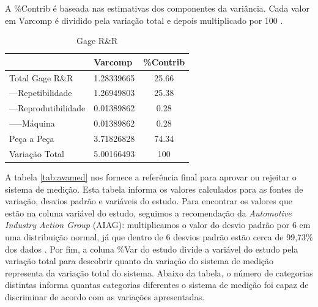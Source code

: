 \documentclass[
12pt,					%
openright,				%
oneside,				%
a4paper,				%
english,
brazil
]{ABNT/abntex2_report}
\begin{document}
A \%Contrib  é baseada nas estimativas dos componentes da variância. Cada valor em Varcomp é dividido pela variação total e depois multiplicado por 100 \cite{estudos_rr}.  

\begin{table}[H]
	\caption{Gage R\&R}
	\centering
	\begin{tabular}{lcc}
										   & \multicolumn{1}{l}{Varcomp} & \multicolumn{1}{l}{\%Contrib} \\ \hline
	\multicolumn{1}{l|}{Total Gage R\&R}   & 1.28339665                  & 25.66                         \\
	\multicolumn{1}{l|}{---Repetibilidade}    & 1.26949803                  & 25.38                         \\
	\multicolumn{1}{l|}{---Reprodutibilidade} & 0.01389862                  & 0.28                          \\
	\multicolumn{1}{l|}{-----Máquina}           & 0.01389862                  & 0.28                          \\
	\multicolumn{1}{l|}{Peça a Peça}      & 3.71826828                  & 74.34                         \\
	\multicolumn{1}{l|}{Variação Total}    & 5.00166493                  & 100                          
	\end{tabular}
	\label{tab:gagerr}
\end{table}

A tabela \ref{tab:avamed} nos fornece a referência final para aprovar ou rejeitar o sistema de medição. Esta tabela informa os valores calculados para as fontes de variação, desvios padrão e variáveis do estudo. Para encontrar os valores que estão na coluna variável do estudo, seguimos a recomendação da \textit{Automotive Industry Action Group }(AIAG): multiplicamos o valor do desvio padrão por 6 em uma distribuição normal, já que dentro de 6 desvios padrão estão cerca de 99,73\% dos dados \cite{estudos_rr}. Por fim, a coluna \%Var do estudo divide a variável do estudo pela variação total para descobrir quanto da variação do sistema de medição representa da variação total do sistema. Abaixo da tabela, o número de categorias distintas informa quantas categorias diferentes o sistema de medição foi capaz de discriminar de acordo com as variações apresentadas.  
\end{document}
